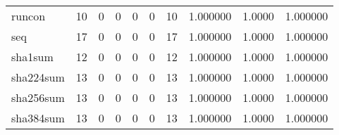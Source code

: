 \begin{longtable}{lrrrrrrrrr}
runcon    &                                       10 &                                                  0 &                                                  0 &                                                  0 &                                                  0 &                                                 10 &                                           1.000000 &                                 1.0000 &                             1.000000 \\
seq       &                                       17 &                                                  0 &                                                  0 &                                                  0 &                                                  0 &                                                 17 &                                           1.000000 &                                 1.0000 &                             1.000000 \\
sha1sum   &                                       12 &                                                  0 &                                                  0 &                                                  0 &                                                  0 &                                                 12 &                                           1.000000 &                                 1.0000 &                             1.000000 \\
sha224sum &                                       13 &                                                  0 &                                                  0 &                                                  0 &                                                  0 &                                                 13 &                                           1.000000 &                                 1.0000 &                             1.000000 \\
sha256sum &                                       13 &                                                  0 &                                                  0 &                                                  0 &                                                  0 &                                                 13 &                                           1.000000 &                                 1.0000 &                             1.000000 \\
sha384sum &                                       13 &                                                  0 &                                                  0 &                                                  0 &                                                  0 &                                                 13 &                                           1.000000 &                                 1.0000 &                             1.000000 \\

\end{longtable}
